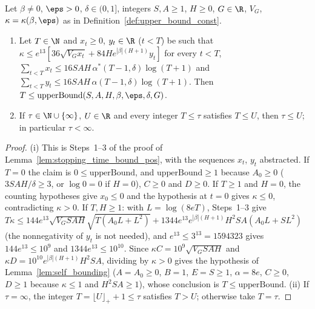 \begin{lemma}\label{lem:pos_core_stopping_time}
\leanok
{}
Let $\beta \ne 0$, $\eps > 0$, $\delta \in (0, 1]$, integers $S, A \ge 1$, $H \ge 0$, $G \in \R$, $V_G$, $\kappa = \kappa(\beta, \eps)$ as in
Definition~\ref{def:upper_bound_const}.
\begin{enumerate}
  \item[(i)] Let $T \in \N$ and $x_t \ge 0$, $y_t \in \R$ ($t < T$) be such that
  $\kappa \le e^{13}[36\sqrt{V_Gx_t} + 84He^{|\beta|(H+1)}y_t]$ for every $t < T$,
  $\sum_{t<T}x_t \le 16SAH\,\alpha^*(T-1,\delta)\log(T+1)$ and $\sum_{t<T}y_t \le 16SAH\,\alpha(T-1,\delta)\log(T+1)$.
  Then $T \le \mathrm{upperBound}(S, A, H, \beta, \eps, \delta, G)$.
  \item[(ii)] If $\tau \in \N \cup \{\infty\}$, $U \in \R$ and every integer $T \le \tau$ satisfies $T \le U$, then
  $\tau \le U$; in particular $\tau < \infty$.
\end{enumerate}
\end{lemma}

\begin{proof}
\leanok
(i) This is Steps~1--3 of the proof of Lemma~\ref{lem:stopping_time_bound_pos}, with the sequences
$x_t$, $y_t$ abstracted. If $T = 0$ the claim is $0 \le \mathrm{upperBound}$, and $\mathrm{upperBound} \ge 1$
because $A_0 \ge 0$ ($3SAH/\delta \ge 3$, or $\log 0 = 0$ if $H = 0$), $C \ge 0$ and $D \ge 0$. If $T \ge 1$ and
$H = 0$, the counting hypotheses give $x_0 \le 0$ and the hypothesis at $t = 0$ gives $\kappa \le 0$,
contradicting $\kappa > 0$. If $T, H \ge 1$: with $L = \log(8eT)$, Steps~1--3 give
$T\kappa \le 144e^{13}\sqrt{V_GSAH}\sqrt{T(A_0L + L^2)} + 1344e^{13}e^{|\beta|(H+1)}H^2SA(A_0L + SL^2)$
(the nonnegativity of $y_t$ is not needed), and $e^{13} \le 3^{13} = 1594323$ gives
$144e^{13} \le 10^9$ and $1344e^{13} \le 10^{10}$. Since $\kappa C = 10^9\sqrt{V_GSAH}$ and
$\kappa D = 10^{10}e^{|\beta|(H+1)}H^2SA$, dividing by $\kappa > 0$ gives the hypothesis of
Lemma~\ref{lem:self_bounding} ($A = A_0 \ge 0$, $B = 1$, $E = S \ge 1$, $\alpha = 8e$, $C \ge 0$, $D \ge 1$ because
$\kappa \le 1$ and $H^2SA \ge 1$), whose conclusion is $T \le \mathrm{upperBound}$.
(ii) If $\tau = \infty$, the integer $T = \lfloor U\rfloor_+ + 1 \le \tau$ satisfies $T > U$; otherwise take $T = \tau$.
\end{proof}

